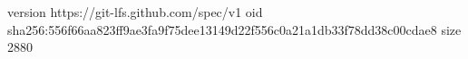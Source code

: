version https://git-lfs.github.com/spec/v1
oid sha256:556f66aa823ff9ae3fa9f75dee13149d22f556c0a21a1db33f78dd38c00cdae8
size 2880
